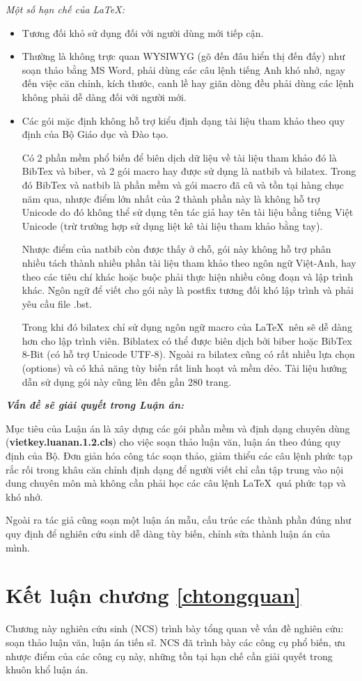 \textit{Một số hạn chế của \LaTeX:}
\begin{itemize}
	\item Tương đối khỏ sử dụng đối với người dùng mới tiếp cận.
	\item Thường là không trực quan WYSIWYG (gõ đến đâu hiển thị đến đấy) như soạn thảo bằng MS Word, phải dùng các câu lệnh tiếng Anh khó nhớ, ngay đến việc căn chỉnh, kích thước, canh lề hay giãn dòng đều phải dùng các lệnh không phải dễ dàng đối với người mới.
	\item Các gói mặc định không hỗ trợ kiểu định dạng tài liệu tham khảo theo quy định của Bộ Giáo dục và Đào tạo. 
	
	Có 2 phần mềm phổ biến để biên dịch dữ liệu về tài liệu tham khảo đó là BibTex và biber, và 2 gói macro hay được sử dụng là natbib và bilatex. Trong đó BibTex và natbib là phần mềm và gói macro đã cũ và tồn tại hàng chục năm qua, nhược điểm lớn nhất của 2 thành phần này là không hỗ trợ Unicode do đó không thể sử dụng tên tác giả hay tên tài liệu bằng tiếng Việt Unicode (trừ trường hợp sử dụng liệt kê tài liệu tham khảo bằng tay).
	
	Nhược điểm của natbib còn được thấy ở chỗ, gói này không hỗ trợ phân nhiều tách thành nhiều phần tài liệu tham khảo theo ngôn ngữ Việt-Anh, hay theo các tiêu chí khác hoặc buộc phải thực hiện nhiều công đoạn và lập trình khác. Ngôn ngữ để viết cho gói này là postfix tương đối khó lập trình và phải yêu cầu file .bst. 
	
	Trong khi đó bilatex chỉ sử dụng ngôn ngữ macro của \LaTeX\ nên sẽ dễ dàng hơn cho lập trình viên. Biblatex có thể được biên dịch bởi biber hoặc BibTex 8-Bit (có hỗ trợ Unicode UTF-8). Ngoài ra bilatex cũng có rất nhiều lựa chọn (options) và có khả năng tùy biến rất linh hoạt và mềm dẻo. Tài liệu hướng dẫn sử dụng gói này cũng lên đến gần 280 trang.
\end{itemize}
\textbf{\textit{Vấn đề sẽ giải quyết trong Luận án:}}

Mục tiêu của Luận án là xây dựng các gói phần mềm và định dạng chuyên dùng (\textbf{vietkey.luanan.1.2.cls}) cho việc soạn thảo luận văn, luận án theo đúng quy định của Bộ. Đơn giản hóa công tác soạn thảo, giảm thiểu các câu lệnh phức tạp rắc rối trong khâu căn chỉnh định dạng để người viết chỉ cần tập trung vào nội dung chuyên môn mà không cần phải học các câu lệnh \LaTeX\ quá phức tạp và khó nhớ.

Ngoài ra tác giả cũng soạn một luận án mẫu, cấu trúc các thành phần đúng như quy định để nghiên cứu sinh dễ dàng tùy biến, chỉnh sửa thành luận án của mình.

\section{\bf Kết luận chương \ref{chtongquan}}

Chương này nghiên cứu sinh (NCS) trình bày tổng quan về vấn đề nghiên cứu: soạn thảo luận văn, luận án tiến sĩ. NCS đã trình bày các công cụ phổ biến, ưu nhược điểm của các công cụ này, những tồn tại hạn chế cần giải quyết trong khuôn khổ luận án.